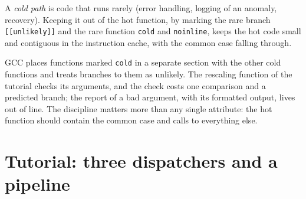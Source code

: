 \begin{definition}\label{def:ll:cpp-for-latency-ii-compile-time:cold}
A \emph{cold path} is code that runs rarely (error handling, logging of an anomaly, recovery). Keeping it
out of the hot function, by marking the rare branch \texttt{[[unlikely]]} and the rare function \texttt{cold} and
\texttt{noinline}, keeps the hot code small and contiguous in the instruction cache, with the common case falling through.
\end{definition}

GCC places functions marked \texttt{cold} in a separate section with the other cold functions and treats branches to them
as unlikely. The rescaling function of the tutorial checks its arguments, and the check costs one comparison and a
predicted branch; the report of a bad argument, with its formatted output, lives out of line. The discipline matters more
than any single attribute: the hot function should contain the common case and calls to everything else.

\section{Tutorial: three dispatchers and a pipeline}\label{tut:ll:cpp-for-latency-ii-compile-time:tut}

